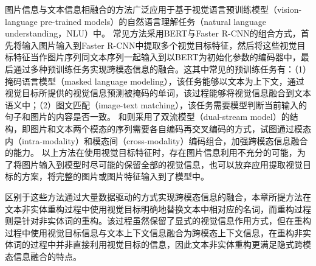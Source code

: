 图片信息与文本信息相融合的方法广泛应用于基于视觉语言预训练模型（vision-language pre-trained models）的自然语言理解任务（natural language understanding，NLU）中。
常见方法采用BERT与Faster R-CNN的组合方式，首先将输入图片输入到Faster R-CNN中提取多个视觉目标特征，然后将这些视觉目标特征当作图片序列同文本序列一起输入到以BERT为初始化参数的编码器中，最后通过多种预训练任务实现跨模态信息的融合。这其中常见的预训练任务有：（1）掩码语言模型（masked language modeling），该任务能够以文本为上下文，通过视觉目标所提供的视觉信息预测被掩码的单词，该过程能够将视觉信息融合到文本语义中；（2）图文匹配（image-text matching），该任务需要模型判断当前输入的句子和图片的内容是否一致。
和则采用了双流模型（dual-stream model）的结构，即图片和文本两个模态的序列需要各自编码再交叉编码的方式，试图通过模态内（intra-modality）和模态间（cross-modality）编码组合，加强跨模态信息融合的能力。
以上方法在使用视觉目标特征时，存在图片信息利用不充分的可能，为了将图片输入到模型时尽可能的保留全部的视觉信息，也可以放弃应用提取视觉目标的方案，将完整的图片或图片特征输入到了模型中。

区别于这些方法通过大量数据驱动的方式实现跨模态信息的融合，本章所提方法在文本非实体重构过程中使用视觉目标明确地替换文本中相对应的名词，而重构过程则是针对非实体词的重构。该过程虽然保留了显式的视觉信息作用方式，但在重构过程中使用视觉目标信息与文本上下文信息融合为跨模态上下文信息，在重构非实体词的过程中并非直接利用视觉目标的信息，因此文本非实体重构更满足隐式跨模态信息融合的特点。






